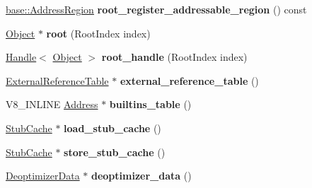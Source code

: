 \begin{DoxyCompactItemize}
\mbox{\hyperlink{classv8_1_1base_1_1AddressRegion}{base\+::\+Address\+Region}} {\bfseries root\+\_\+register\+\_\+addressable\+\_\+region} () const
\item 
\mbox{\label{classv8_1_1internal_1_1Isolate_aa4708ff42ba4d2d4c07203d6a90b8b5e}} 
\mbox{\hyperlink{classv8_1_1internal_1_1Object}{Object}} $\ast$ {\bfseries root} (Root\+Index index)
\item 
\mbox{\label{classv8_1_1internal_1_1Isolate_ab35ce4502f90b1162ab757183f1a11c6}} 
\mbox{\hyperlink{classv8_1_1internal_1_1Handle}{Handle}}$<$ \mbox{\hyperlink{classv8_1_1internal_1_1Object}{Object}} $>$ {\bfseries root\+\_\+handle} (Root\+Index index)
\item 
\mbox{\label{classv8_1_1internal_1_1Isolate_a1e4671a3d79330c44f0d3903848b09cb}} 
\mbox{\hyperlink{classv8_1_1internal_1_1ExternalReferenceTable}{External\+Reference\+Table}} $\ast$ {\bfseries external\+\_\+reference\+\_\+table} ()
\item 
\mbox{\label{classv8_1_1internal_1_1Isolate_a065259f255b946008bed2fd33ca1df4c}} 
V8\+\_\+\+I\+N\+L\+I\+NE \mbox{\hyperlink{classuintptr__t}{Address}} $\ast$ {\bfseries builtins\+\_\+table} ()
\item 
\mbox{\label{classv8_1_1internal_1_1Isolate_aa656ac390c6482f1b14783f3d613885b}} 
\mbox{\hyperlink{classv8_1_1internal_1_1StubCache}{Stub\+Cache}} $\ast$ {\bfseries load\+\_\+stub\+\_\+cache} ()
\item 
\mbox{\label{classv8_1_1internal_1_1Isolate_a5e4de0d5d79745bd7c5109761941140f}} 
\mbox{\hyperlink{classv8_1_1internal_1_1StubCache}{Stub\+Cache}} $\ast$ {\bfseries store\+\_\+stub\+\_\+cache} ()
\item 
\mbox{\label{classv8_1_1internal_1_1Isolate_a5aefcc1cffaeff1dcf78f4443757d8f6}} 
\mbox{\hyperlink{classv8_1_1internal_1_1DeoptimizerData}{Deoptimizer\+Data}} $\ast$ {\bfseries deoptimizer\+\_\+data} ()
\item 
\mbox{\label{classv8_1_1internal_1_1Isolate_a00a09f87dcfa9e38c43511485acfaac0}} 

\end{DoxyCompactItemize}

